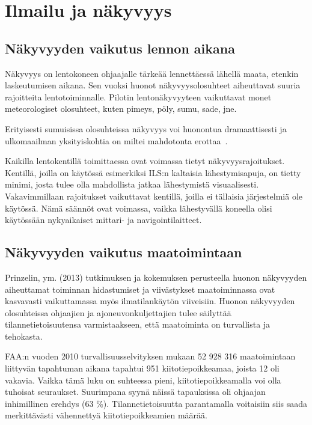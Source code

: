 \documentclass[utf8,bachelor,manualbib]{gradu3}
\begin{document}
  
\mainmatter

\chapter{Ilmailu ja näkyvyys} \label{lukuviite} %

\section{Näkyvyyden vaikutus lennon aikana}

Näkyvyys on lentokoneen ohjaajalle tärkeää lennettäessä lähellä maata, etenkin laskeutumisen aikana. Sen vuoksi huonot näkyvyysolosuhteet aiheuttavat suuria rajoitteita lentotoiminnalle. Pilotin lentonäkyvyyteen vaikuttavat monet meteorologiset olosuhteet, kuten pimeys, pöly, sumu, sade, jne.~\cite{mollersachs1994}

Erityisesti sumuisissa olosuhteissa näkyvyys voi huonontua dramaattisesti ja ulkomaailman yksityiskohtia on miltei mahdotonta erottaa~\cite{beiergemperlein2004}.

Kaikilla lentokentillä toimittaessa ovat voimassa tietyt näkyvyysrajoitukset. Kentillä, joilla on käytössä esimerkiksi ILS:n kaltaisia lähestymisapuja, on tietty minimi, josta tulee olla mahdollista jatkaa lähestymistä visuaalisesti. Vakavimmillaan rajoitukset vaikuttavat kentillä, joilla ei tällaisia järjestelmiä ole käytössä. Nämä säännöt ovat voimassa, vaikka lähestyvällä koneella olisi käytössään nykyaikaiset mittari- ja navigointilaitteet.~\cite{mollersachs1994}

\section{Näkyvyyden vaikutus maatoimintaan}

Prinzelin, ym. (2013) tutkimuksen ja kokemuksen perusteella huonon näkyvyyden aiheuttamat toiminnan hidastumiset ja viivästykset maatoiminnassa ovat kasvavasti vaikuttamassa myös ilmatilankäytön viiveisiin. Huonon näkyvyyden olosuhteissa ohjaajien ja ajoneuvonkuljettajien tulee säilyttää tilannetietoisuutensa varmistaakseen, että maatoiminta on turvallista ja tehokasta.

FAA:n vuoden 2010 turvallisuusselvityksen mukaan 52 928 316 maatoimintaan liittyvän tapahtuman aikana tapahtui 951 kiitotiepoikkeamaa, joista 12 oli vakavia. Vaikka tämä luku on suhteessa pieni, kiitotiepoikkeamalla voi olla tuhoisat seuraukset. Suurimpana syynä näissä tapauksissa oli ohjaajan inhimillinen erehdys (63 \%). Tilannetietoisuutta parantamalla voitaisiin siis saada merkittävästi vähennettyä kiitotiepoikkeamien määrää.~\cite{prinzelym2013}
\end{document}
